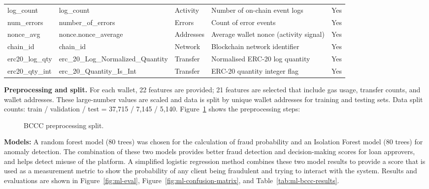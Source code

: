 \begin{table}[H]
\begin{tabular}{@{}p{2.4cm}p{3.6cm}p{2.0cm}p{4.8cm}p{1.0cm}@{}}
log\_count & log\_count & Activity & Number of on-chain event logs & Yes \\
num\_errors & number\_of\_errors & Errors & Count of error events & Yes \\
nonce\_avg & nonce.nonce\_average & Addresses & Average wallet nonce (activity signal) & Yes \\
chain\_id & chain\_id & Network & Blockchain network identifier & Yes \\
erc20\_log\_qty & erc\_20\_Log\_Normalized\_Quantity & Transfer & Normalised ERC-20 log quantity & Yes \\
erc20\_qty\_int & erc\_20\_Quantity\_Is\_Int & Transfer & ERC-20 quantity integer flag & Yes \\
\bottomrule
\end{tabular}
\end{table}

\textbf{Preprocessing and split.} For each wallet, 22 features are provided; 21 features are selected that include gas usage, transfer counts, and wallet addresses. These large-number values are scaled and data is split by unique wallet addresses for training and testing sets. Data split counts: train / validation / test = 37{,}715 / 7{,}145 / 5{,}140. Figure~\ref{fig:ml-preprocessing-split} shows the preprocessing steps:

\begin{figure}[H]
\centering
{}
\caption[BCCC preprocessing split]{BCCC preprocessing split.}
\label{fig:ml-preprocessing-split}
\end{figure}

\textbf{Models:} A random forest model (80 trees) was chosen for the calculation of fraud probability and an Isolation Forest model (80 trees) for anomaly detection. The combination of these two models provides better fraud detection and decision-making scores for loan approvers, and helps detect misuse of the platform. A simplified logistic regression method combines these two model results to provide a score that is used as a measurement metric to show the probability of any client being fraudulent and trying to interact with the system. Results and evaluations are shown in Figure~\ref{fig:ml-eval}, Figure~\ref{fig:ml-confusion-matrix}, and Table~\ref{tab:ml-bccc-results}.

